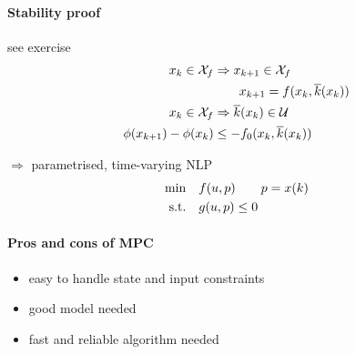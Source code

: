 \paragraph{Stability proof} see exercise\\
\begin{align}
    x_k \in \setX{f} &\Rightarrow x_{k+1} \in \setX{f}\\
        &\qquad x_{k+1} = f ( x_k, \overline{k}(x_k) ) \nonumber\\
    x_k \in \setX{f} &\Rightarrow \overline{k} (x_k) \in \setU{}\\
    \phi(x_{k+1}) - \phi(x_k) &\leq -f_0 (x_k, \overline{k}(x_k))
\end{align}

$\Rightarrow$ parametrised, time-varying NLP
\begin{align*}
    \min \quad  & f(u,p) \qquad p = x(k)\\
    \textnormal{s.t.} \quad   & g(u,p) \leq 0
\end{align*}

\paragraph{Pros and cons of MPC}
\begin{itemize}
    \item easy to handle state and input constraints
    \item good model needed
    \item fast and reliable algorithm needed
\end{itemize}

~\vspace{1em}\\
